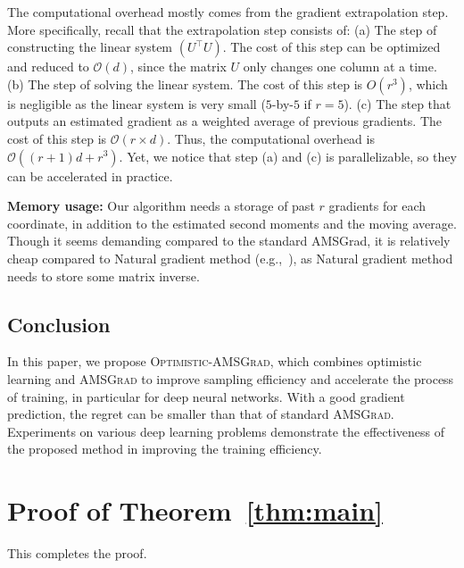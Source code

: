 \documentclass[11pt]{article}
\makeatletter
\renewenvironment{proof}[1][\proofname]{%
   \par\pushQED{\qed}\normalfont%
   \topsep6\p@\@plus6\p@\relax
   \trivlist\item[\hskip\labelsep\bfseries#1]%
   \ignorespaces
}{%
   \popQED\endtrivlist\@endpefalse
}
\theoremstyle{k}
\makeatother
\begin{document}
The computational overhead mostly comes from the gradient extrapolation step. More specifically, recall that the extrapolation step consists of:
(a) The step of constructing the linear system $(U^\top U)$.
The cost of this step can be optimized and reduced to $\mathcal O(d)$, since the matrix $U$ only changes one column at a time.
(b) The step of solving the linear system.
The cost of this step is $O(r^3)$, which is negligible as the linear system is very small ($5$-by-$5$ if $r=5$).
(c) The step that outputs an estimated gradient as a weighted average of previous gradients.
The cost of this step is $\mathcal O(r \times d)$. Thus, the computational overhead is $\mathcal O\left((r+1)d+r^3\right)$.
Yet, we notice that step (a) and (c) is parallelizable, so they can be accelerated in practice.

\noindent \textbf{Memory usage:} Our algorithm needs a storage of past $r$ gradients for each coordinate, in addition to the estimated second moments and the moving average. Though it seems demanding compared to the standard AMSGrad, it is relatively cheap compared to Natural gradient method (e.g.,~\cite{MG15}), as Natural gradient method needs to store some matrix inverse.

\subsection{Conclusion}
In this paper, we propose \textsc{Optimistic-AMSGrad}, which combines optimistic learning and \textsc{AMSGrad} to improve sampling efficiency and
accelerate the process of training, in particular for deep neural networks. With a good gradient prediction, the regret can be smaller than that of standard \textsc{AMSGrad}. Experiments on various deep learning problems demonstrate the effectiveness of the proposed method in improving the training efficiency. 



\clearpage




\clearpage


\appendix

\section{Proof of Theorem~\ref{thm:main}} \label{app:thm}

\begin{proof}

This completes the proof.
\end{proof}

\end{document}
